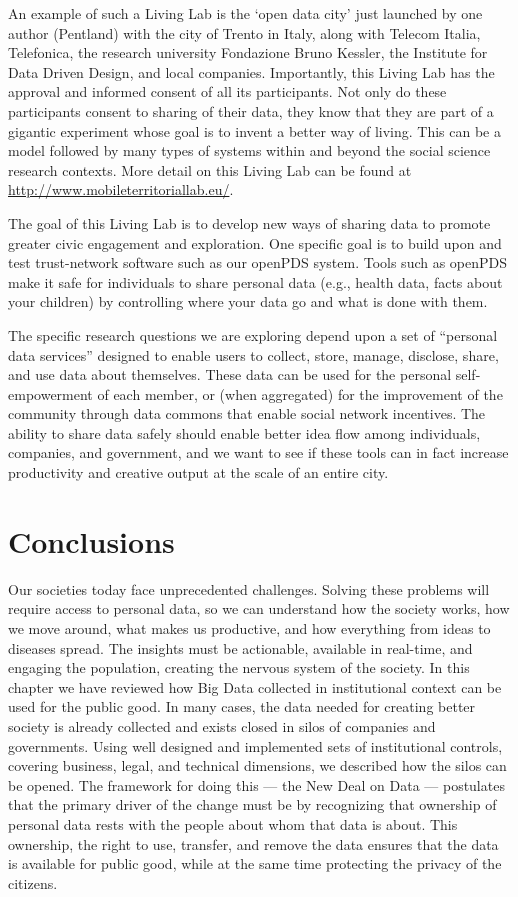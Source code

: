 An example of such a Living Lab is the `open data city' just launched by one author (Pentland) with the city of Trento in Italy, along with Telecom Italia, Telefonica, the research university Fondazione Bruno Kessler, the Institute for Data Driven Design, and local companies.
Importantly, this Living Lab has the approval and informed consent of all its participants.  Not only do these participants consent to sharing of their data, they know that they are part of a gigantic experiment whose goal is to invent a better way of living.  This can be a model followed by many types of systems within and beyond the social science research contexts.  
More detail on this Living Lab can be found at \url{http://www.mobileterritoriallab.eu/}.

The goal of this Living Lab is to develop new ways of sharing data to promote greater civic engagement and exploration.
One specific goal is to build upon and test trust-network software such as our openPDS system.
Tools such as openPDS make it safe for individuals to share personal data (e.g., health data, facts about your children) by controlling where your data go and what is done with them.

The specific research questions we are exploring depend upon a set of ``personal data services'' designed to enable users to collect, store, manage, disclose, share, and use data about themselves.
These data can be used for the personal self-empowerment of each member, or (when aggregated) for the improvement of the community through data commons that enable social network incentives.
The ability to share data safely should enable better idea flow among individuals, companies, and government, and we want to see if these tools can in fact increase productivity and creative output at the scale of an entire city.



\section{Conclusions}

Our societies today face unprecedented challenges.
Solving these problems will require access to personal data, so we can understand how the society works, how we move around, what makes us productive, and how everything from ideas to diseases spread.  
The insights must be actionable, available in real-time, and engaging the population, creating the nervous system of the society.
In this chapter we have reviewed how Big Data collected in institutional context can be used for the public good.
In many cases, the data needed for creating better society is already collected and exists closed in silos of companies and governments.
Using well designed and implemented sets of institutional controls, covering business, legal, and technical dimensions, we described how the silos can be opened.
The framework for doing this --- the New Deal on Data --- postulates that the primary driver of the change must be by recognizing that ownership of personal data rests with the people about whom that data is about.
This ownership, the right to use, transfer, and remove the data ensures that the data is available for public good, while at the same time protecting the privacy of the citizens.

